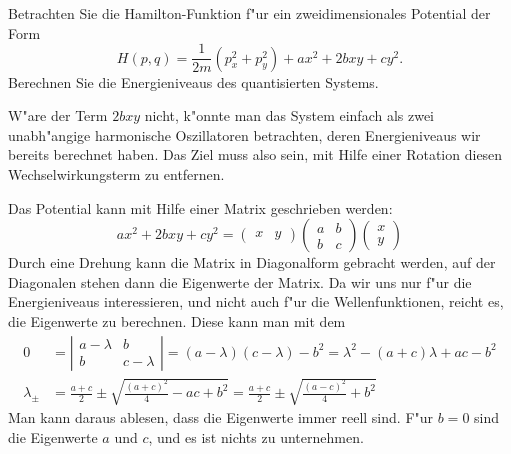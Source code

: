 Betrachten Sie die Hamilton-Funktion f"ur ein zweidimensionales Potential
der Form
\[
H(p, q)=\frac1{2m}(p_x^2+p_y^2)+ax^2+2bxy+cy^2.
\]
Berechnen Sie die Energieniveaus des quantisierten Systems.

\begin{loesung}
W"are der Term $2bxy$ nicht, k"onnte man das System einfach als zwei
unabh"angige harmonische Oszillatoren betrachten, deren Energieniveaus
wir bereits berechnet haben.
Das Ziel muss also sein, mit Hilfe einer Rotation diesen 
Wechselwirkungsterm zu entfernen.

Das Potential kann mit Hilfe einer Matrix geschrieben werden:
\[
ax^2+2bxy+cy^2
=
\begin{pmatrix}x&y\end{pmatrix}
\begin{pmatrix}a&b\\b&c\end{pmatrix}
\begin{pmatrix}x\\y\end{pmatrix}
\]
Durch eine Drehung kann die Matrix in Diagonalform gebracht werden,
auf der Diagonalen stehen dann die Eigenwerte der Matrix.
Da wir uns nur f"ur die Energieniveaus interessieren, und nicht
auch f"ur die Wellenfunktionen, reicht es, die Eigenwerte zu
berechnen.
Diese kann man mit dem 
\begin{align*}
0
&=
\left|\begin{matrix}
a-\lambda&b\\
b&c-\lambda
\end{matrix}\right|
=
(a-\lambda)(c-\lambda)-b^2
=
\lambda^2-(a+c)\lambda+ac-b^2
\\
\lambda_{\pm}
&=
\frac{a+c}2\pm\sqrt{\frac{(a+c)^2}4-ac+b^2}
=
\frac{a+c}2\pm\sqrt{\frac{(a-c)^2}4+b^2}
\end{align*}
Man kann daraus ablesen, dass die Eigenwerte immer reell sind.
F"ur $b=0$ sind die Eigenwerte $a$ und $c$, und es ist nichts
zu unternehmen.


\end{loesung}
